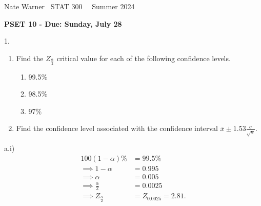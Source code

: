 \documentclass{report}
\title{\Huge{}}
\author{\huge{Nathan Warner}}
\date{\huge{}}
\begin{document}
 \pagebreak \bigbreak \noindent
 Nate Warner \ \quad \quad \quad \quad \quad \quad \quad \quad \quad \quad \quad \quad  STAT 300 \quad  \quad \quad \quad \quad \quad \quad \quad \quad \ \ \quad Summer 2024
 \begin{center}
     \textbf{PSET 10 - Due: Sunday, July 28}
 \end{center}
 \bigbreak \noindent 
\begin{mdframed}
1. 
\begin{enumerate}[label=(\alph*)]
    \item Find the $Z_{\frac{\alpha}{2}}$ critical value for each of the following confidence levels.
    \begin{enumerate}[label=(\roman*)]
        \item 99.5\%
        \item 98.5\%
        \item 97\%
    \end{enumerate}
    \item Find the confidence level associated with the confidence interval $\bar{x} \pm 1.53 \frac{\sigma}{\sqrt{n}}$.
\end{enumerate}
\end{mdframed}
\bigbreak \noindent 
a.i) 
\begin{align*}
    100(1-\alpha)\% &= 99.5\% \\
    \implies 1-\alpha &= 0.995 \\
    \implies \alpha &= 0.005 \\
    \implies \frac{\alpha}{2} &= 0.0025 \\
    \implies Z_{\frac{\alpha}{2}} &= Z_{0.0025} = 2.81
.\end{align*}
\end{document}
